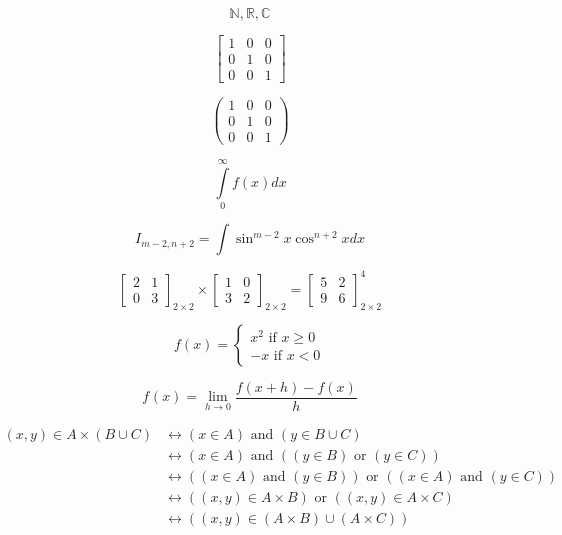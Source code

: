 \documentclass[a4paper, 12pt]{article}
\newcommand{\N}{\mathbb{N}}
\newcommand{\R}{\mathbb{R}}
\newcommand{\Ce}{\mathbb{C}}
\begin{document}
	$$\N , \R, \Ce$$
	
	$$
	\begin{bmatrix}
		1 & 0 & 0\\
		0 & 1 & 0\\
		0 & 0 & 1
	\end{bmatrix}
	$$
	
	$$
	\begin{pmatrix}
	1 & 0 & 0\\
	0 & 1 & 0\\
	0 & 0 & 1
	\end{pmatrix}
	$$
	
	$$\int\limits_{0}^{\infty} f(x)dx$$
	
	$$I_{m-2, n+2} = \int \sin^{m-2}x \cos^{n+2}xdx$$
	
	\begin{equation}
		\begin{bmatrix}
			2 & 1\\
			0 & 3
		\end{bmatrix}_{2 \times 2}
		\times
		\begin{bmatrix}
			1 & 0\\
			3 & 2
		\end{bmatrix}_{2 \times 2}
		=
		\begin{bmatrix}
			5 & 2\\
			9 & 6
		\end{bmatrix}^4_{2 \times 2}
	\end{equation}
	
	\begin{equation}
		f(x) = \begin{cases}
			x^2 \text{ if }x \geq 0 \\
			-x \text{ if }x < 0
		\end{cases}
	\end{equation}
	
	\begin{equation}
		f^{}(x) = \lim_{h \to 0} \frac{f(x + h) - f(x)}{h}
	\end{equation}
	
	\begin{align*}
		(x, y) \in A \times (B \cup C) &\leftrightarrow (x \in A) \text{ and } (y \in B \cup C) \\ 
		&\leftrightarrow (x \in A) \text{ and } ((y \in B) \text{ or } (y \in C))\\
		&\leftrightarrow ((x \in A) \text{ and } (y \in B)) \text{ or } ((x \in A) \text{ and } (y \in C))\\
		&\leftrightarrow((x, y) \in A \times B) \text{ or } ((x, y) \in A \times C) \\
		&\leftrightarrow((x, y) \in (A \times B) \cup (A \times C))
	\end{align*}
	
\end{document}
